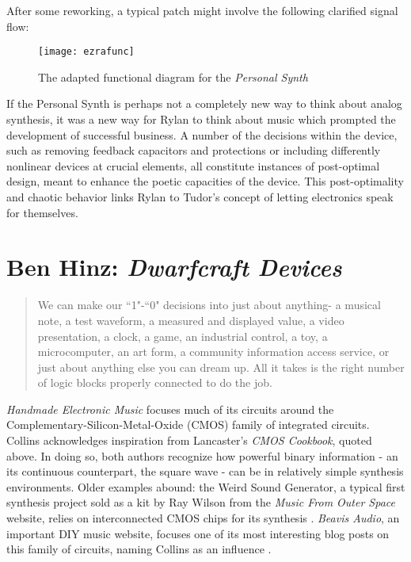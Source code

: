 After some reworking, a typical patch might involve the following clarified signal flow: 

\begin{figure}[H]
	  \centering
	    \texttt{[image: ezrafunc]}
	    \caption{The adapted functional diagram for the \textit{Personal Synth}}
	\end{figure} 
	
If the Personal Synth is perhaps not a completely new way to think about analog synthesis, it was a new way for Rylan to think about music which prompted the development of successful business. A number of the decisions within the device, such as removing feedback capacitors and protections or including differently nonlinear devices at crucial elements, all constitute instances of post-optimal design, meant to enhance the poetic capacities of the device. This post-optimality and chaotic behavior links Rylan to Tudor's concept of letting electronics speak for themselves.  

\section{Ben Hinz: \textit{Dwarfcraft Devices}} 

\begin{quote}
	
	We can make our ``1"-``0" decisions into just about anything- a musical note, a test waveform, a measured and displayed value, a video presentation, a clock, a game, an industrial control, a toy, a microcomputer, an art form, a community information access service, or just about anything else you can dream up. All it takes is the right number of logic blocks properly connected to do the job.
	\citep[pp-7-8]{lancaster1988}
	
\end{quote}

\emph{Handmade Electronic Music} focuses much of its circuits around the Complementary-Silicon-Metal-Oxide (CMOS) family of integrated circuits. Collins acknowledges inspiration from Lancaster's \textit{CMOS Cookbook}, quoted above. In doing so, both authors recognize how powerful binary information - an its continuous counterpart, the square wave - can be in relatively simple synthesis environments. Older examples abound: the Weird Sound Generator, a typical first synthesis project sold as a kit by Ray Wilson from the \emph{Music From Outer Space} website, relies on interconnected CMOS chips for its synthesis \citep{wilson2015}. \textit{Beavis Audio}, an important DIY music website, focuses one of its most interesting blog posts on this family of circuits, naming Collins as an influence \citep{beavis2015}. 

